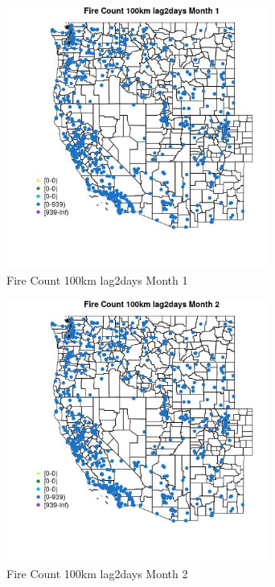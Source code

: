 \begin{figure} 
\centering  
\includegraphics[width=0.77\textwidth]{Code_Outputs/Report_ML_input_PM25_Step4_part_e_de_duplicated_aves_compiled_2019-05-21wNAs_MapObsMo1Fire_Count_100km_lag2days.jpg} 
\caption{\label{fig:Report_ML_input_PM25_Step4_part_e_de_duplicated_aves_compiled_2019-05-21wNAsMapObsMo1Fire_Count_100km_lag2days}Fire Count 100km lag2days Month 1} 
\end{figure} 
 

\begin{figure} 
\centering  
\includegraphics[width=0.77\textwidth]{Code_Outputs/Report_ML_input_PM25_Step4_part_e_de_duplicated_aves_compiled_2019-05-21wNAs_MapObsMo2Fire_Count_100km_lag2days.jpg} 
\caption{\label{fig:Report_ML_input_PM25_Step4_part_e_de_duplicated_aves_compiled_2019-05-21wNAsMapObsMo2Fire_Count_100km_lag2days}Fire Count 100km lag2days Month 2} 
\end{figure} 
 

